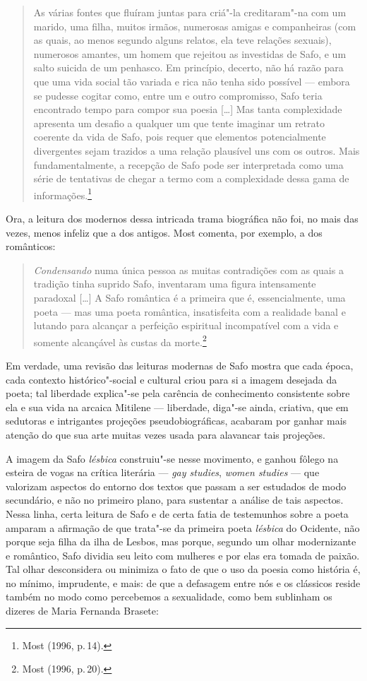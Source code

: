 \begin{quote}
As várias fontes que fluíram juntas para criá"-la creditaram"-na com um marido,
uma filha, muitos irmãos, numerosas amigas e companheiras (com as quais, ao
menos segundo alguns relatos, ela teve relações sexuais), numerosos amantes, um
homem que rejeitou as investidas de Safo, e um salto suicida de um penhasco. Em
princípio, decerto, não há razão para que uma vida social tão variada e rica
não tenha sido possível --- embora se pudesse cogitar como, entre um e outro
compromisso, Safo teria encontrado tempo para compor sua poesia {[}\ldots{}{]} Mas tanta
complexidade apresenta um desafio a qualquer um que tente imaginar um retrato
coerente da vida de Safo, pois requer que elementos potencialmente divergentes
sejam trazidos a uma relação plausível uns com os outros. Mais
fundamentalmente, a recepção de Safo pode ser interpretada como uma série de
tentativas de chegar a termo com a complexidade dessa gama de informações.\footnote{ Most (1996, p.\,14).}
\end{quote}

Ora, a leitura dos modernos dessa intricada trama biográfica não foi, no mais
das vezes, menos infeliz que a dos antigos. Most comenta, por exemplo,
a dos românticos:

\begin{quote}
\emph{Condensando} numa única pessoa as muitas contradições com as quais a
tradição tinha suprido Safo, inventaram uma figura intensamente paradoxal
{[}\ldots{}{]} A Safo romântica é a primeira que é, essencialmente, uma poeta --- mas uma
poeta romântica, insatisfeita com a realidade banal e lutando para alcançar a
perfeição espiritual incompatível com a vida e somente alcançável às custas da
morte.\footnote{ Most (1996, p.\,20).}
\end{quote}

Em verdade, uma revisão das leituras modernas de Safo mostra que cada época,
 cada contexto histórico"-social e cultural criou para si a imagem desejada da
 poeta; tal liberdade explica"-se pela carência de conhecimento consistente sobre
 ela e sua vida na arcaica Mitilene --- liberdade, diga"-se ainda, criativa, que
 em sedutoras e intrigantes projeções pseudobiográficas, acabaram por
 ganhar mais atenção do que sua arte
 muitas vezes usada para alavancar tais projeções.

A imagem da Safo \emph{lésbica} construiu"-se nesse movimento, e ganhou fôlego
na esteira de vogas na crítica literária --- \emph{gay studies}, \emph{women
studies} --- que valorizam aspectos do entorno dos textos que passam a ser
estudados de modo secundário, e não no primeiro plano, para sustentar a análise
de tais aspectos. Nessa linha, certa leitura de Safo e de certa fatia de
testemunhos sobre a poeta amparam a afirmação de que trata"-se da primeira poeta
\emph{lésbica} do Ocidente, não porque seja filha da ilha de Lesbos, mas
porque, segundo um olhar modernizante e romântico, Safo dividia seu leito com mulheres e por
elas era tomada de paixão.
Tal olhar desconsidera ou minimiza o fato de que o uso da poesia como história é, no mínimo, imprudente, e mais: de que a defasagem entre nós e os clássicos reside também no modo como percebemos a sexualidade, como bem sublinham os dizeres de Maria Fernanda Brasete:

